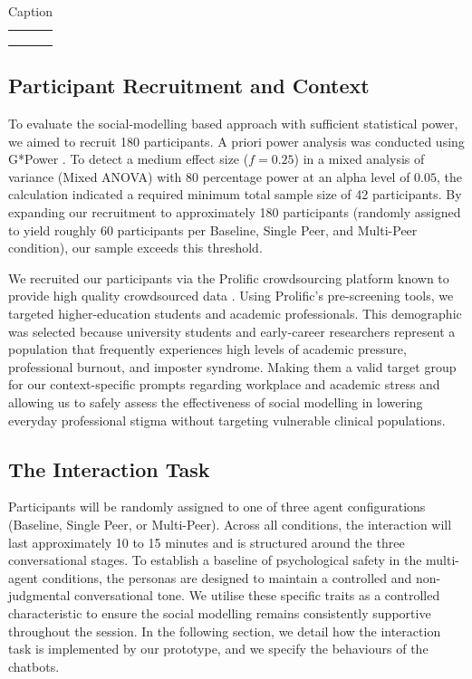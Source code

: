\documentclass[sigconf]{acmart}
\begin{document}
\begin{table}
    \centering
    \begin{tabular}{ccc}
         &  & \\
         &  & \\
         &  & \\
    \end{tabular}
    \caption{Caption}
    \label{tab:liwc_variables}
\end{table}

\subsection{Participant Recruitment and Context}
To evaluate the social-modelling based approach with sufficient statistical power, we aimed to recruit 180 participants. A priori power analysis was conducted using G*Power \cite{Faul2007GPower}. To detect a medium effect size ($f=0.25$) in a mixed analysis of variance (Mixed ANOVA) with 80 percentage power at an alpha level of $0.05$, the calculation indicated a required minimum total sample size of 42 participants. By expanding our recruitment to approximately 180 participants (randomly assigned to yield roughly 60 participants per Baseline, Single Peer, and Multi-Peer condition), our sample exceeds this threshold. 

We recruited our participants via the Prolific crowdsourcing platform known to provide high quality crowdsourced data \cite{Douglas2023DataSONA}. Using Prolific's pre-screening tools, we targeted higher-education students and academic professionals. This demographic was selected because university students and early-career researchers represent a population that frequently experiences high levels of academic pressure, professional burnout, and imposter syndrome. Making them a valid target group for our context-specific prompts regarding workplace and academic stress and allowing us to safely assess the effectiveness of social modelling in lowering everyday professional stigma without targeting vulnerable clinical populations.

\subsection{The Interaction Task}
Participants will be randomly assigned to one of three agent configurations (Baseline, Single Peer, or Multi-Peer). Across all conditions, the interaction will last approximately 10 to 15 minutes and is structured around the three conversational stages. To establish a baseline of psychological safety in the multi-agent conditions, the personas are designed to maintain a controlled and non-judgmental conversational tone. We utilise these specific traits as a controlled characteristic to ensure the social modelling remains consistently supportive throughout the session. In the following section, we detail how the interaction task is implemented by our prototype, and we specify the behaviours of the chatbots.
\end{document}
